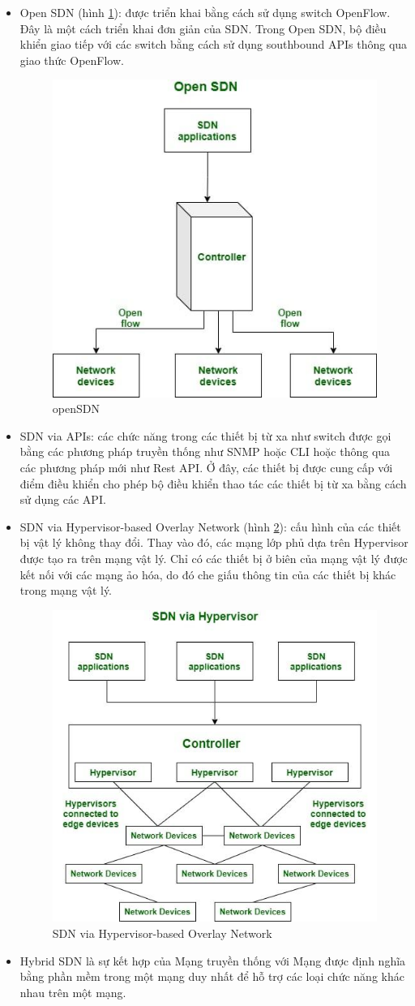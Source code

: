 \documentclass[a4paper]{article}
\begin{document}
\begin{itemize}
    \item Open SDN (hình \ref{fig:openSDN}): được triển khai bằng cách sử dụng switch OpenFlow. Đây là một cách triển khai đơn giản của SDN. Trong Open SDN, bộ điều khiển giao tiếp với các switch bằng cách sử dụng southbound APIs thông qua giao thức OpenFlow.
    \begin{figure}
        \centering
        \includegraphics[width=0.35\linewidth]{images/openSDN.png}
        \caption{openSDN}
        \label{fig:openSDN}
    \end{figure}
    \item SDN via APIs: các chức năng trong các thiết bị từ xa như switch được gọi bằng các phương pháp truyền thống như SNMP hoặc CLI hoặc thông qua các phương pháp mới như Rest API. Ở đây, các thiết bị được cung cấp với điểm điều khiển cho phép bộ điều khiển thao tác các thiết bị từ xa bằng cách sử dụng các API.
    \item SDN via Hypervisor-based Overlay Network (hình \ref{fig:Hypervisor-based}): cấu hình của các thiết bị vật lý không thay đổi. Thay vào đó, các mạng lớp phủ dựa trên Hypervisor được tạo ra trên mạng vật lý. Chỉ có các thiết bị ở biên của mạng vật lý được kết nối với các mạng ảo hóa, do đó che giấu thông tin của các thiết bị khác trong mạng vật lý.
    \begin{figure}
        \centering
        \includegraphics[width=0.4\linewidth]{SDN via Hypervisor-based Overlay Network.png}
        \caption{SDN via Hypervisor-based Overlay Network}
        \label{fig:Hypervisor-based}
    \end{figure}
    \item Hybrid SDN là sự kết hợp của Mạng truyền thống với Mạng được định nghĩa bằng phần mềm trong một mạng duy nhất để hỗ trợ các loại chức năng khác nhau trên một mạng.
\end{itemize}
\end{document}
